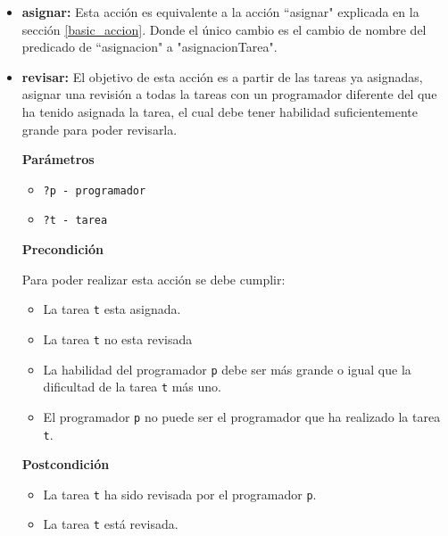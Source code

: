 \documentclass[11pt]{article}
\begin{document}
\begin{itemize}
  \item \textbf{asignar:}
  Esta acción es equivalente a la acción ``asignar" explicada en la sección \ref{basic_accion}. Donde el único cambio es el cambio de nombre del predicado de ``asignacion" a "asignacionTarea".
  \item \textbf{revisar:} El objetivo de esta acción es a partir de las tareas ya asignadas, asignar una revisión a todas la tareas con un programador diferente del que ha tenido asignada la tarea, el cual debe tener habilidad suficientemente grande para poder revisarla.
  
  \textbf{Parámetros}
  \begin{itemize}
  	\item \verb|?p - programador|
  	\item \verb|?t - tarea|
  \end{itemize}
  
  \textbf{Precondición}
  
  Para poder realizar esta acción se debe cumplir:
  \begin{itemize}
  	\item La tarea \texttt{t} esta asignada.
  	\item La tarea \texttt{t} no esta revisada
  	\item La habilidad del programador \texttt{p} debe ser más grande o igual que la dificultad de la tarea \texttt{t} más uno.
  	\item El programador \texttt{p} no puede ser el programador que ha realizado la tarea \texttt{t}.
  \end{itemize}
 
  \textbf{Postcondición}
  
  \begin{itemize}
  	\item La tarea \texttt{t} ha sido revisada por el programador \texttt{p}.
  	\item La tarea \texttt{t} está revisada.
  \end{itemize}
\end{itemize}
\end{document}

